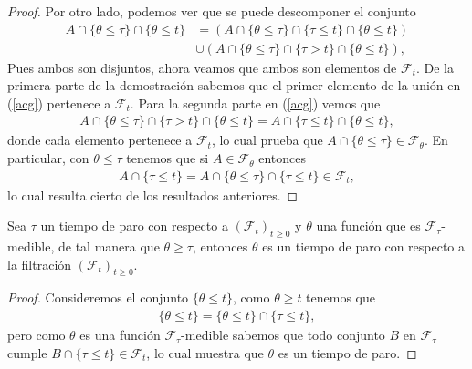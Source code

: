 \begin{proof}
	Por otro lado, podemos ver que se puede descomponer el conjunto
	\begin{align}
		A \cap \{\theta \leq \tau\} \cap \{\theta \leq t\} & = \left( A \cap \{\theta \leq \tau\} \cap \{\tau \leq t\} \cap \{\theta \leq t\} \right) \nonumber \\
		& \cup \left( A \cap \{\theta \leq \tau\} \cap \{\tau > t\} \cap \{\theta \leq t\} \right), \label{acg}
	\end{align}
Pues ambos son disjuntos, ahora veamos que ambos son elementos de $\mathcal{F}_t$. De la primera parte de la demostración sabemos que el primer elemento de la unión en (\ref{acg}) pertenece a $\mathcal{F}_t$. Para la segunda parte en (\ref{acg}) vemos que
	\begin{align*}
		A \cap \{\theta \leq \tau\} \cap \{\tau > t\} \cap \{\theta \leq t\} = A \cap \{\tau \leq t\} \cap \{\theta \leq t\},
	\end{align*}
	donde cada elemento pertenece a $\mathcal{F}_t$, lo cual prueba que $A \cap \{\theta \leq \tau\} \in \mathcal{F}_{\theta}$. En particular, con $\theta \leq \tau$ tenemos que si $A \in \mathcal{F}_{\theta}$ entonces
	\begin{align*}
		A \cap \{ \tau \leq t \} = A \cap \{ \theta \leq \tau \} \cap \{ \tau \leq t \} \in \mathcal{F}_t,
	\end{align*}
	lo cual resulta cierto de los resultados anteriores.
\end{proof}

\begin{lemma}
	\label{nosequeponer}
	Sea $\tau$ un tiempo de paro con respecto a $(\mathcal{F}_t)_{t \geq 0}$ y $\theta$ una función que es $\mathcal{F}_{\tau}$-medible, de tal manera que $\theta \geq \tau$, entonces $\theta$ es un tiempo de paro con respecto a la filtración $(\mathcal{F}_t)_{t \geq 0}$.
\end{lemma}
\begin{proof}
	Consideremos el conjunto $\{ \theta \leq t \}$, como $\theta \geq t$ tenemos que
	\begin{align*}
		\{\theta \leq t\} = \{\theta \leq t\} \cap \{\tau \leq t\},
	\end{align*}
	pero como $\theta$ es una función $\mathcal{F}_{\tau}$-medible sabemos que todo conjunto $B$ en $\mathcal{F}_{\tau}$ cumple $B \cap \{\tau \leq t\} \in \mathcal{F}_t$, lo cual muestra que $\theta$ es un tiempo de paro.
\end{proof}


